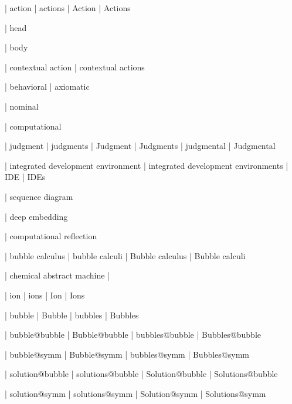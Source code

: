 
 | action
 | actions
 | Action
 | Actions



 | head

 | body

 | contextual action
 | contextual actions
 
 | behavioral
 | axiomatic

 | nominal

 | computational

 | judgment
 | judgments
 | Judgment
 | Judgments
 | judgmental
 | Judgmental


 | integrated development environment
 | integrated development environments
 | IDE
 | IDEs

 | sequence diagram

 | deep embedding

 | computational reflection


 | bubble calculus
 | bubble calculi
 | Bubble calculus
 | Bubble calculi

 | chemical abstract machine
 | \cham
 
 | ion
 | ions
 | Ion
 | Ions

 | bubble
 | Bubble
 | bubbles
 | Bubbles

 | bubble@bubble
 | Bubble@bubble
 | bubbles@bubble
 | Bubbles@bubble

 | bubble@symm
 | Bubble@symm
 | bubbles@symm
 | Bubbles@symm

 | solution@bubble
 | solutions@bubble
 | Solution@bubble
 | Solutions@bubble

 | solution@symm
 | solutions@symm
 | Solution@symm
 | Solutions@symm

